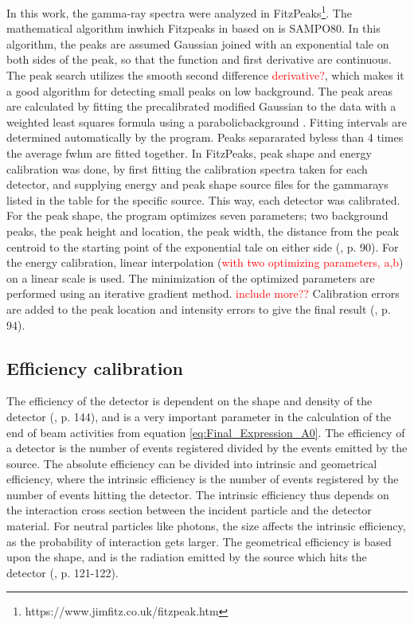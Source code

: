 \noindent 
In this work, the gamma-ray spectra were analyzed in FitzPeaks\footnote{https://www.jimfitz.co.uk/fitzpeak.htm}. The mathematical algorithm inwhich Fitzpeaks in based on is SAMPO80\cite{Koskelo1981}. In this algorithm, the peaks are assumed Gaussian joined with an exponential tale on both sides of the peak, so that the function and first derivative are continuous. The peak search utilizes the smooth second difference \textcolor{red}{derivative?}, which makes it a good algorithm for detecting small peaks on low background\cite{Koskelo1981}. The peak areas are calculated by fitting the precalibrated modified Gaussian to the data with a weighted least squares formula using a parabolicbackground \cite{THE ARTICLE HERE, but what page??}.  Fitting intervals are determined automatically by the program.  Peaks separarated byless than 4 times the average fwhm are fitted together. In FitzPeaks, peak shape and energy calibration was done, by first fitting the calibration spectra taken for each detector, and  supplying energy and peak shape source files for the gammarays listed in the table for the specific source. This way, each detector was calibrated. For the peak shape, the program optimizes seven parameters; two background peaks, the peak height and location, the peak width, the distance from the peak centroid to the starting point of the exponential tale on either side (\cite{Koskelo1981}, p. 90). 
For the energy calibration, linear interpolation (\textcolor{red}{with two optimizing parameters, a,b}) on a linear scale is used. The minimization of the optimized parameters are performed using an iterative gradient method. \textcolor{red}{include more??}  Calibration errors are added to the peak location and intensity errors to give the final result (\cite{Koskelo1981}, p. 94). 
 


\noindent 
\subsection{Efficiency calibration}
The efficiency of the detector is dependent on the shape and density of the detector (\cite{Gilmore2008}, p. 144), and is a very important parameter in the calculation of the end of beam activities from equation \ref{eq:Final_Expression_A0}. The efficiency of a detector is the number of events registered divided by the events emitted by the source. The absolute efficiency can be divided into intrinsic and geometrical efficiency, where the intrinsic efficiency is the number of events registered by the number of events hitting the detector. The intrinsic efficiency thus depends on the interaction cross section between the incident particle and the detector material. For neutral particles like photons, the size affects the intrinsic efficiency, as the probability of interaction gets larger. The geometrical efficiency is based upon the shape, and is the radiation emitted by the source which hits the detector (\cite{Leo1994}, p. 121-122).\\ 

